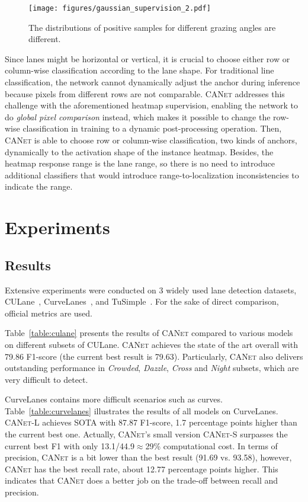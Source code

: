 \documentclass{article}
\newcommand\self{\textsc{CANet}\xspace}
\begin{document}
\begin{figure}
  \centering
  \texttt{[image: figures/gaussian\_supervision\_2.pdf]}
  \caption{The distributions of positive samples for different grazing angles are
    different.}
  \label{fig:gaussian_supervision}
\end{figure}

Since lanes might be horizontal or vertical, it is crucial to choose either row or column-wise classification according to the lane shape. For traditional line classification, the network cannot dynamically adjust the anchor during inference because pixels from different rows are not comparable. \self addresses this challenge with the aforementioned heatmap supervision, enabling the network to do \emph{global pixel comparison} instead, which makes it possible to change the row-wise classification in training to a dynamic post-processing operation. Then, \self is able to choose row or column-wise classification, two kinds of anchors, dynamically to the activation shape of the instance heatmap. 
Besides, the heatmap response range is the lane range, so there is no need to introduce additional classifiers that would introduce range-to-localization inconsistencies to indicate the range.

\section{Experiments}
\label{sec:experiments}



\subsection{Results}
Extensive experiments were conducted on 3 widely used lane detection datasets,
CULane~\cite{scnn}, CurveLanes~\cite{curvelanes}, and TuSimple~\cite{tusimple}.
For the sake of direct comparison, official metrics are used.

Table~\ref{table:culane} presents the results of \self compared to various models on different subsets of CULane. \self achieves the state of the art overall with 79.86 F1-score (the current best result is 79.63). Particularly, \self also delivers outstanding performance in \emph{Crowded}, \emph{Dazzle}, \emph{Cross} and \emph{Night} subsets, which are very difficult to detect. 

CurveLanes contains more difficult scenarios such as curves. Table~\ref{table:curvelanes} illustrates the results of all models on CurveLanes. \self-L achieves SOTA with 87.87 F1-score, 1.7 percentage points higher than the current best one. Actually, \self's small version \self-S surpasses the current best F1 with only 13.1/44.9$\approx$29\% computational cost. In terms of precision, \self is a bit lower than the best result (91.69 vs. 93.58), however, \self has the best recall rate, about 12.77 percentage points higher. This indicates that \self does a better job on the trade-off between recall and precision.
\end{document}
